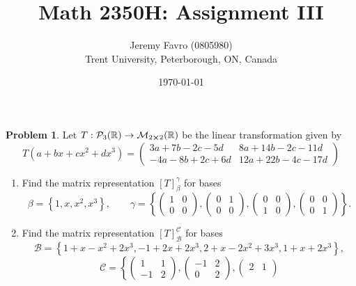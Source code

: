\documentclass[10pt]{article}
\title{Math 2350H: Assignment III}
\author{Jeremy Favro (0805980) \\ Trent University, Peterborough, ON, Canada}
\date{\today}
\theoremstyle{definition}
\newtheorem{problem}{Problem}
\begin{document}
\maketitle

\begin{problem}
Let $T:\mathcal{P}_3(\mathbb{R})\to\mathcal{M}_{2\cross2}(\mathbb{R})$ be the linear transformation given by
$$T(a+bx+cx^2+dx^3)=\begin{pmatrix}
    3a + 7b - 2c - 5d  & 8a + 14b - 2c - 11d  \\
    -4a - 8b + 2c + 6d & 12a + 22b - 4c - 17d
  \end{pmatrix}$$
\begin{enumerate}[label=(\alph*)]
  \item Find the matrix representation $\left[T\right]_\beta^\gamma$ for bases
        $$\beta = \left\{1, x, x^2, x^3\right\},\qquad
          \gamma=\left\{
          \begin{pmatrix}
            1 & 0 \\
            0 & 0
          \end{pmatrix},
          \begin{pmatrix}
            0 & 1 \\
            0 & 0
          \end{pmatrix},
          \begin{pmatrix}
            0 & 0 \\
            1 & 0
          \end{pmatrix},
          \begin{pmatrix}
            0 & 0 \\
            0 & 1
          \end{pmatrix}
          \right\}.$$
  \item Find the matrix representation $\left[T\right]_\mathcal{B}^\mathcal{C}$ for bases
        $$\mathcal{B}=\left\{1 + x - x^2 + 2x^3, -1 + 2x + 2x^3, 2 + x - 2x^2 + 3x^3, 1 + x + 2x^3\right\},$$
        $$
          \mathcal{C}=\left\{
          \begin{pmatrix}
            1  & 1 \\
            -1 & 2
          \end{pmatrix},
          \begin{pmatrix}
            -1 & 2 \\
            0  & 2
          \end{pmatrix},
          \begin{pmatrix}
            2  & 1 \\

\end{pmatrix}$$
\end{enumerate}
\end{problem}
\end{document}
